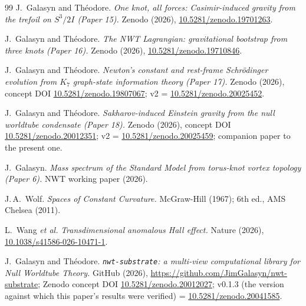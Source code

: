 \documentclass[11pt]{article}
\begin{document}
\begin{thebibliography}{99}
  J.~Galasyn and Th\'eodore.
  \emph{One knot, all forces: Casimir-induced gravity from the
  trefoil on $S^3/2I$ (Paper 15).}
  Zenodo (2026), \href{https://doi.org/10.5281/zenodo.19701263}
  {10.5281/zenodo.19701263}.

  J.~Galasyn and Th\'eodore.
  \emph{The NWT Lagrangian: gravitational bootstrap from three knots
  (Paper 16).}
  Zenodo (2026), \href{https://doi.org/10.5281/zenodo.19710846}
  {10.5281/zenodo.19710846}.

  J.~Galasyn and Th\'eodore.
  \emph{Newton's constant and rest-frame Schr\"odinger evolution
  from $K_7$ graph-state information theory (Paper 17).}
  Zenodo (2026), concept DOI
  \href{https://doi.org/10.5281/zenodo.19807067}
  {10.5281/zenodo.19807067};
  v2 = \href{https://doi.org/10.5281/zenodo.20025452}
  {10.5281/zenodo.20025452}.

  J.~Galasyn and Th\'eodore.
  \emph{Sakharov-induced Einstein gravity from the null worldtube
  condensate (Paper 18).}
  Zenodo (2026), concept DOI
  \href{https://doi.org/10.5281/zenodo.20012351}
  {10.5281/zenodo.20012351};
  v2 = \href{https://doi.org/10.5281/zenodo.20025459}
  {10.5281/zenodo.20025459};
  companion paper to the present one.

  J.~Galasyn.
  \emph{Mass spectrum of the Standard Model from torus-knot vortex
  topology (Paper 6).}
  NWT working paper (2026).

  J.\,A.~Wolf.
  \emph{Spaces of Constant Curvature.}
  McGraw-Hill (1967); 6th ed., AMS Chelsea (2011).

  L.~Wang \emph{et al.}
  \emph{Transdimensional anomalous Hall effect.}
  Nature (2026), \href{https://doi.org/10.1038/s41586-026-10471-1}
  {10.1038/s41586-026-10471-1}.

  J.~Galasyn and Th\'eodore.
  \emph{\texttt{nwt-substrate}: a multi-view computational library
  for Null Worldtube Theory.}
  GitHub (2026), \url{https://github.com/JimGalasyn/nwt-substrate};
  Zenodo concept DOI
  \href{https://doi.org/10.5281/zenodo.20012027}
  {10.5281/zenodo.20012027}; v0.1.3 (the version against which this
  paper's results were verified) =
  \href{https://doi.org/10.5281/zenodo.20041585}
  {10.5281/zenodo.20041585}.

\end{thebibliography}
\end{document}
